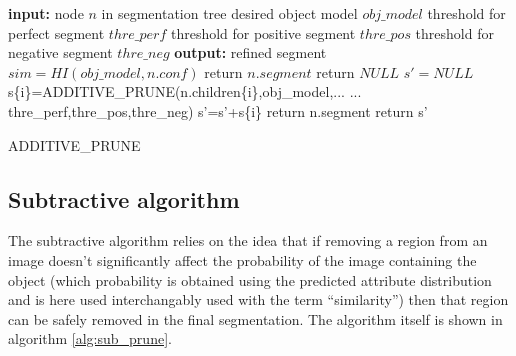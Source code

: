 \documentclass[10pt,twocolumn,letterpaper]{article}
\begin{document}
\begin{algorithm}
\begin{algorithmic}
  \STATE \textbf{input:} 
  \STATE \hspace{3 mm} node $n$ in segmentation tree
  \STATE \hspace{3 mm} desired object model $obj\_model$
  \STATE \hspace{3 mm} threshold for perfect segment $thre\_perf$
  \STATE \hspace{3 mm} threshold for positive segment $thre\_pos$
  \STATE \hspace{3 mm} threshold for negative segment $thre\_neg$
  \STATE \textbf{output:} 
  \STATE \hspace{3 mm} refined segment 
  \STATE
  \STATE $sim=HI(obj\_model,n.conf)$
    \STATE return $n.segment$
  \ENDIF
    \STATE return $NULL$
  \ENDIF
  \STATE $s'=NULL$
    \STATE s\{i\}=ADDITIVE\_PRUNE(n.children\{i\},obj\_model,...
    \STATE ... thre\_perf,thre\_pos,thre\_neg)
    \STATE s'=s'+s\{i\}
  \ENDFOR
    \STATE return n.segment
  \ELSE
    \STATE return s'
  \ENDIF
\end{algorithmic}
\caption{ADDITIVE\_PRUNE}
\label{alg:add_prune}
\end{algorithm}
 


\subsection{Subtractive algorithm}

The subtractive algorithm relies on the idea that if removing a region from
an image doesn't significantly affect the probability of the image containing
the object (which probability is obtained using the predicted attribute 
distribution and is here used interchangably used with the term ``similarity'')
then that region can be safely removed in the final segmentation.
The algorithm itself is shown in algorithm \ref{alg:sub_prune}.
\end{document}
